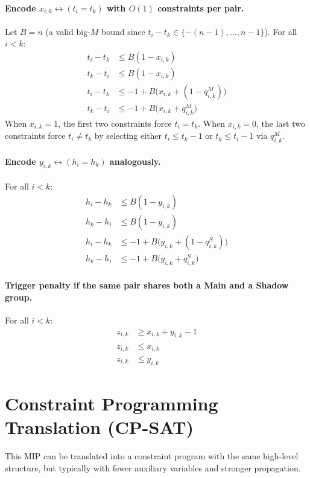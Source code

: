 \documentclass[12pt]{article}
\begin{document}
\paragraph{Encode $x_{i,k} \leftrightarrow (t_i=t_k)$ with $O(1)$ constraints per pair.}
Let $B=n$ (a valid big-$M$ bound since $t_i-t_k\in\{-(n-1),\dots,n-1\}$). For all $i<k$:
\begin{align}
t_i - t_k &\le B(1-x_{i,k}) \\
t_k - t_i &\le B(1-x_{i,k}) \\
t_i - t_k &\le -1 + B\bigl(x_{i,k} + (1-q^M_{i,k})\bigr) \\
t_k - t_i &\le -1 + B\bigl(x_{i,k} + q^M_{i,k}\bigr)
\end{align}
When $x_{i,k}=1$, the first two constraints force $t_i=t_k$. When $x_{i,k}=0$, the last two constraints force $t_i\ne t_k$ by selecting either $t_i\le t_k-1$ or $t_k\le t_i-1$ via $q^M_{i,k}$.

\paragraph{Encode $y_{i,k} \leftrightarrow (h_i=h_k)$ analogously.}
For all $i<k$:
\begin{align}
h_i - h_k &\le B(1-y_{i,k}) \\
h_k - h_i &\le B(1-y_{i,k}) \\
h_i - h_k &\le -1 + B\bigl(y_{i,k} + (1-q^S_{i,k})\bigr) \\
h_k - h_i &\le -1 + B\bigl(y_{i,k} + q^S_{i,k}\bigr)
\end{align}

\paragraph{Trigger penalty if the same pair shares both a Main and a Shadow group.}
For all $i<k$:
\begin{align}
z_{i,k} &\ge x_{i,k} + y_{i,k} - 1\\
z_{i,k} &\le x_{i,k}\\
z_{i,k} &\le y_{i,k}
\end{align}

\section{Constraint Programming Translation (CP-SAT)}
	This MIP can be translated into a constraint program with the same high-level structure, but typically with fewer auxiliary variables and stronger propagation.
\end{document}
